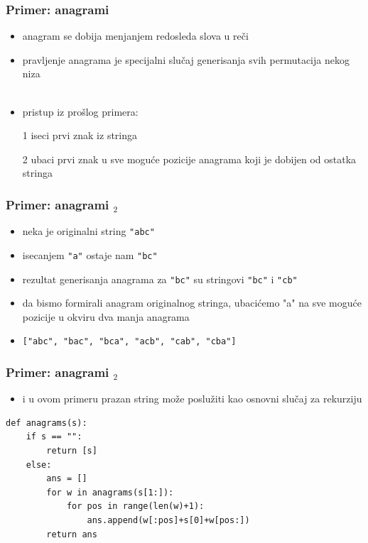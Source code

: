 \documentclass[utf8,compress,aspectratio=169]{beamer}
\begin{document}
\begin{frame}[fragile]
  \frametitle{Primer: anagrami}
  \begin{itemize}
    \item anagram se dobija menjanjem redosleda slova u reči
    \item pravljenje anagrama je specijalni slučaj generisanja svih permutacija nekog niza \\ \ \\
    \item pristup iz prošlog primera:
    \item[1] iseci prvi znak iz stringa
    \item[2] ubaci prvi znak u sve moguće pozicije anagrama koji je dobijen od ostatka stringa
  \end{itemize}
\end{frame}

\begin{frame}[fragile]
  \frametitle{Primer: anagrami $_2$}
  \begin{itemize}
    \item neka je originalni string \texttt{"abc"}
    \item isecanjem \texttt{"a"} ostaje nam \texttt{"bc"}
    \item rezultat generisanja anagrama za \texttt{"bc"} su stringovi \texttt{"bc"} i \texttt{"cb"}
    \item da bismo formirali anagram originalnog stringa, ubacićemo "a" na sve moguće pozicije u okviru dva manja anagrama
    \item \texttt{["abc", "bac", "bca", "acb", "cab", "cba"]}
  \end{itemize}
\end{frame}

\begin{frame}[fragile]
  \frametitle{Primer: anagrami $_2$}
  \begin{itemize}
    \item i u ovom primeru prazan string može poslužiti kao osnovni slučaj za rekurziju
  \end{itemize}
\begin{verbatim}
def anagrams(s):
    if s == "":
        return [s]
    else:
        ans = []
        for w in anagrams(s[1:]):
            for pos in range(len(w)+1):
                ans.append(w[:pos]+s[0]+w[pos:])
        return ans
\end{verbatim}
\end{frame}
\end{document}
